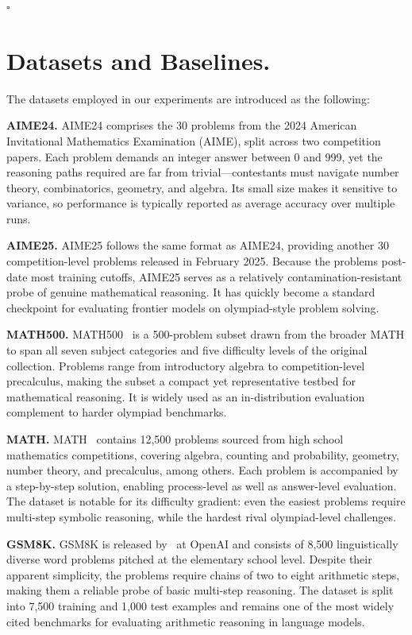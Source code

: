 \documentclass{article}
\begin{document}
\hfill$\square$
\section{Datasets and Baselines.}\label{appx:b}
The datasets employed in our experiments are introduced as the following:

\noindent\textbf{AIME24.} AIME24 comprises the 30 problems from the 2024 American Invitational Mathematics Examination (AIME), split across two competition papers. Each problem demands an integer answer between 0 and 999, yet the reasoning paths required are far from trivial—contestants must navigate number theory, combinatorics, geometry, and algebra. Its small size makes it sensitive to variance, so performance is typically reported as average accuracy over multiple runs.

\noindent\textbf{AIME25.} AIME25 follows the same format as AIME24, providing another 30 competition-level problems released in February 2025. Because the problems post-date most training cutoffs, AIME25 serves as a relatively contamination-resistant probe of genuine mathematical reasoning. It has quickly become a standard checkpoint for evaluating frontier models on olympiad-style problem solving.

\noindent\textbf{MATH500.} MATH500~\cite{lightman2023let} is a 500-problem subset drawn from the broader MATH to span all seven subject categories and five difficulty levels of the original collection. Problems range from introductory algebra to competition-level precalculus, making the subset a compact yet representative testbed for mathematical reasoning. It is widely used as an in-distribution evaluation complement to harder olympiad benchmarks.

\noindent\textbf{MATH.} MATH~\cite{hendrycks2021measuring} contains 12,500 problems sourced from high school mathematics competitions, covering algebra, counting and probability, geometry, number theory, and precalculus, among others. Each problem is accompanied by a step-by-step solution, enabling process-level as well as answer-level evaluation. The dataset is notable for its difficulty gradient: even the easiest problems require multi-step symbolic reasoning, while the hardest rival olympiad-level challenges.

\noindent\textbf{GSM8K.} GSM8K is released by~\cite{cobbe2021training} at OpenAI and consists of 8,500 linguistically diverse word problems pitched at the elementary school level. Despite their apparent simplicity, the problems require chains of two to eight arithmetic steps, making them a reliable probe of basic multi-step reasoning. The dataset is split into 7,500 training and 1,000 test examples and remains one of the most widely cited benchmarks for evaluating arithmetic reasoning in language models.
\end{document}
